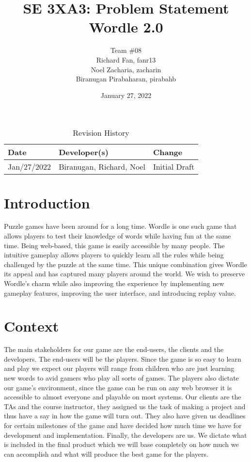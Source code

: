 \documentclass{article}
\title{SE 3XA3: Problem Statement\\Wordle 2.0}
\author{Team \#08
		\\ Richard Fan, fanr13
		\\ Noel Zacharia, zacharin
		\\ Biranugan Pirabaharan, pirabahb
}
\date{January 27, 2022}
\begin{document}
\maketitle

\newpage

\tableofcontents
\listoftables

\newpage

\begin{table}[hp]
\caption{Revision History} \label{TblRevisionHistory}
\begin{tabularx}{\textwidth}{llX}
\toprule
\textbf{Date} & \textbf{Developer(s)} & \textbf{Change}\\
\midrule
Jan/27/2022 & Biranugan, Richard, Noel & Initial Draft\\
\bottomrule
\end{tabularx}
\end{table}

\newpage

\section{Introduction}\label{sec:intro}
Puzzle games have been around for a long time. Wordle is one such game that allows players to test their knowledge of words while having fun at the same time. Being web-based, this game is easily accessible by many people. The intuitive gameplay allows players to quickly learn all the rules while being challenged by the puzzle at the same time. This unique combination gives Wordle its appeal and has captured many players around the world. We wish to preserve Wordle’s charm while also improving the experience by implementing new gameplay features, improving the user interface, and introducing replay value.

\section{Context}\label{sec:con}

The main stakeholders for our game are the end-users, the clients and the developers. The end-users will be the players. Since the game is so easy to learn and play we expect our players will range from children who are just learning new words to avid gamers who play all sorts of games. The players also dictate our game’s environment, since the game can be run on any web browser it is accessible to almost everyone and playable on most systems. Our clients are the TAs and the course instructor, they assigned us the task of making a project and thus have a say in how the game will turn out. They also have given us deadlines for certain milestones of the game and have decided how much time we have for development and implementation. Finally, the developers are us. We dictate what is included in the final product which we will base completely on how much we can accomplish and what will produce the best game for the players.
\end{document}
